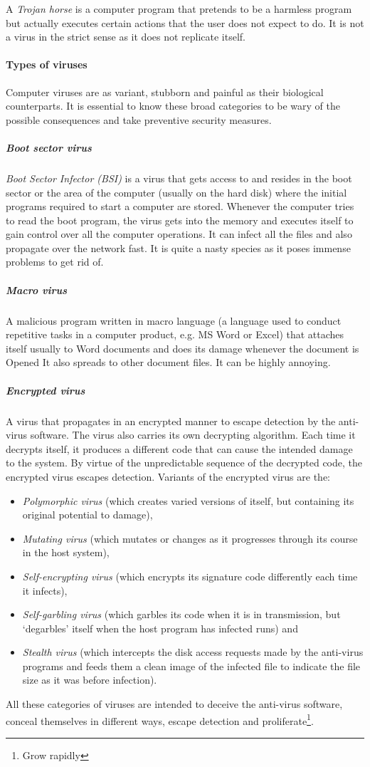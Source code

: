 A \textit{Trojan horse} is a computer program that pretends to be a
harmless program but actually executes certain actions that the user does not expect to do.
It is not a virus in the strict sense as it does not replicate itself.

\paragraph*{Types of viruses}
Computer viruses are as variant, stubborn and painful as their biological counterparts. It is
essential to know these broad categories to be wary of the possible consequences and
take preventive security measures.

\subparagraph*{Boot sector virus}
 \textit{Boot Sector Infector (BSI)} is a virus that gets access to and
resides in the boot sector or the area of the computer (usually on the hard disk) where the initial programs required to start a computer are stored. Whenever the
computer tries to read the boot program, the virus gets into the memory and executes itself
to gain control over all the computer operations. It can infect all the files and also
propagate over the network fast. It is quite a nasty species as it poses immense problems
to get rid of.

\subparagraph*{Macro virus}
A malicious program written in macro language (a language used to conduct repetitive tasks in a computer product, e.g. MS Word or Excel) that attaches
itself usually to Word documents and does its damage whenever the document is Opened
It also spreads to other document files. It can be highly annoying.

\subparagraph*{Encrypted virus}
A virus that propagates in an encrypted manner to escape
detection by the anti-virus software. The virus also carries its own decrypting algorithm. 
Each time it decrypts itself, it produces a different code that can cause the intended damage
to the system. By virtue of the unpredictable sequence of the decrypted code, the encrypted
virus escapes detection. Variants of the encrypted virus are the:
\begin{itemize}
	\item \textit{Polymorphic virus }(which
	creates varied versions of itself, but containing its original potential to damage),
	\item \textit{Mutating virus} (which mutates or changes as it progresses through its course in the host system),
	\item \textit{Self-encrypting virus} (which encrypts its signature code differently each time it infects),
	\item \textit{Self-garbling virus} (which garbles its code when it is in transmission, but ‘degarbles’ itself when the host program has infected runs) and
	\item \textit{Stealth virus} (which intercepts the disk
	access requests made by the anti-virus programs and feeds them a clean image of the
	infected file to indicate the file size as it was before infection).
\end{itemize}
All these categories of viruses are intended to deceive the anti-virus software, conceal themselves in different ways, escape detection and proliferate\footnote{Grow rapidly}.

